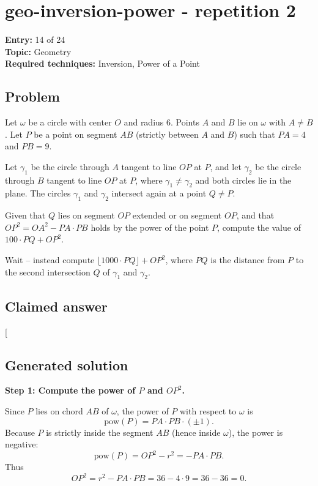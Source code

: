 \documentclass[
  11pt,
  letterpaper,
]{article}
\begin{document}
\clearpage

\section{geo-inversion-power - repetition
2}\label{geo-inversion-power---repetition-2}

\textbf{Entry:} 14 of 24\\
\textbf{Topic:} Geometry\\
\textbf{Required techniques:} Inversion, Power of a Point

\subsection{Problem}\label{problem-13}

Let \(\omega\) be a circle with center \(O\) and radius \(6\). Points
\(A\) and \(B\) lie on \(\omega\) with \(A \neq B\). Let \(P\) be a
point on segment \(AB\) (strictly between \(A\) and \(B\)) such that
\(PA = 4\) and \(PB = 9\).

Let \(\gamma_1\) be the circle through \(A\) tangent to line \(OP\) at
\(P\), and let \(\gamma_2\) be the circle through \(B\) tangent to line
\(OP\) at \(P\), where \(\gamma_1 \neq \gamma_2\) and both circles lie
in the plane. The circles \(\gamma_1\) and \(\gamma_2\) intersect again
at a point \(Q \neq P\).

Given that \(Q\) lies on segment \(OP\) extended or on segment \(OP\),
and that \(OP^2 = OA^2 - PA\cdot PB\) holds by the power of the point
\(P\), compute the value of \(100 \cdot PQ + OP^2\).

Wait -- instead compute \(\lfloor 1000 \cdot PQ \rfloor + OP^2\), where
\(PQ\) is the distance from \(P\) to the second intersection \(Q\) of
\(\gamma_1\) and \(\gamma_2\).

\subsection{Claimed answer}\label{claimed-answer-13}

{[}\boxed{36}{]}

\subsection{Generated solution}\label{generated-solution-13}

\textbf{Step 1: Compute the power of \(P\) and \(OP^2\).}

Since \(P\) lies on chord \(AB\) of \(\omega\), the power of \(P\) with
respect to \(\omega\) is \[\text{pow}(P) = PA \cdot PB \cdot(\pm 1).\]
Because \(P\) is strictly inside the segment \(AB\) (hence inside
\(\omega\)), the power is negative:
\[\text{pow}(P) = OP^2 - r^2 = -PA\cdot PB.\] Thus
\[OP^2 = r^2 - PA\cdot PB = 36 - 4\cdot 9 = 36 - 36 = 0.\]
\end{document}
